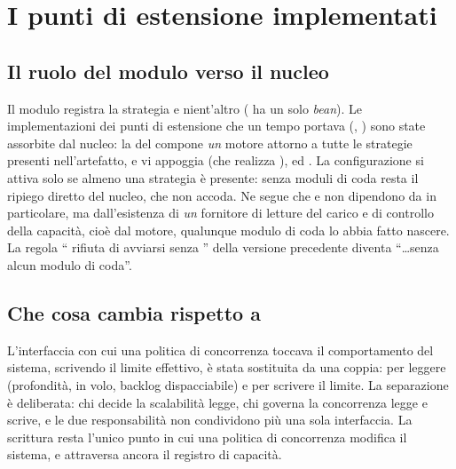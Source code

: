 \section{I punti di estensione implementati}

\subsection{Il ruolo del modulo verso il nucleo}

Il modulo registra la strategia  e nient'altro
( ha un solo \emph{bean}). Le implementazioni dei
punti di estensione che un tempo portava (,
) sono state assorbite dal nucleo: la
 del  compone \emph{un} motore
attorno a tutte le strategie presenti nell'artefatto, e vi appoggia
 (che realizza ),
 ed . La
configurazione si attiva solo se almeno una strategia \`e presente: senza moduli
di coda resta il ripiego diretto del nucleo, che non accoda. Ne segue che
 e  non dipendono da 
in particolare, ma dall'esistenza di \emph{un} fornitore di letture del carico e di
controllo della capacit\`a, cio\`e dal motore, qualunque modulo di coda lo abbia
fatto nascere. La regola `` rifiuta di avviarsi senza
'' della versione precedente diventa ``\ldots senza alcun modulo
di coda''.

\subsection{Che cosa cambia rispetto a }

L'interfaccia con cui una politica di concorrenza toccava il comportamento del
sistema, scrivendo il limite effettivo, \`e stata sostituita da una coppia:
 per leggere (profondit\`a, in volo, backlog
dispacciabile) e  per scrivere il limite. La
separazione \`e deliberata: chi decide la scalabilit\`a legge, chi governa la
concorrenza legge e scrive, e le due responsabilit\`a non condividono pi\`u una sola
interfaccia. La scrittura resta l'unico punto in cui una politica di concorrenza
modifica il sistema, e attraversa ancora il registro di capacit\`a.

